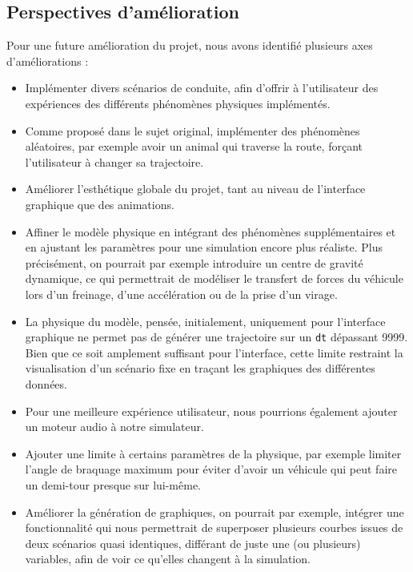 \subsection{Perspectives d'amélioration}\label{subsec:perspectives-d'ameliorations}
Pour une future amélioration du projet, nous avons identifié plusieurs axes d'améliorations :
\begin{itemize}
    \item Implémenter divers scénarios de conduite, afin d'offrir à l'utilisateur des expériences des différents phénomènes physiques implémentés.
    \item Comme proposé dans le sujet original, implémenter des phénomènes aléatoires, par exemple avoir un animal qui traverse la route, forçant l'utilisateur à changer sa trajectoire.
    \item Améliorer l'esthétique globale du projet, tant au niveau de l'interface graphique que des animations.
    \item Affiner le modèle physique en intégrant des phénomènes supplémentaires et en ajustant les paramètres pour une simulation encore plus réaliste.
    Plus précisément, on pourrait par exemple introduire un centre de gravité dynamique, ce qui permettrait de modéliser le transfert de forces du véhicule lors d'un freinage, d'une accélération ou de la prise d'un virage.
    \item La physique du modèle, pensée, initialement, uniquement pour l'interface graphique ne permet pas de générer une trajectoire sur un \texttt{dt} dépassant 9999.
    Bien que ce soit amplement suffisant pour l'interface, cette limite restraint la visualisation d'un scénario fixe en traçant les graphiques des différentes données.
    \item Pour une meilleure expérience utilisateur, nous pourrions également ajouter un moteur audio à notre simulateur.
    \item Ajouter une limite à certains paramètres de la physique, par exemple limiter l'angle de braquage maximum pour éviter d'avoir un véhicule qui peut faire un demi-tour presque sur lui-même.
    \item Améliorer la génération de graphiques, on pourrait par exemple, intégrer une fonctionnalité qui nous permettrait de superposer plusieurs courbes issues de deux scénarios quasi identiques, différant de juste une (ou plusieurs) variables, afin de voir ce qu'elles changent à la simulation.

\end{itemize}


